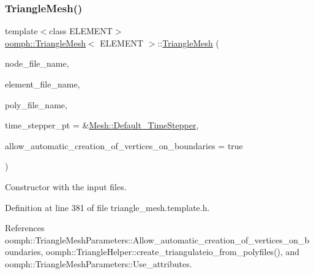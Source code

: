 \subsubsection{\texorpdfstring{Triangle\+Mesh()}{TriangleMesh()}\hspace{0.1cm}{\footnotesize\ttfamily [2/5]}}
{\footnotesize\ttfamily template$<$class E\+L\+E\+M\+E\+NT$>$ \\
\hyperlink{classoomph_1_1TriangleMesh}{oomph\+::\+Triangle\+Mesh}$<$ E\+L\+E\+M\+E\+NT $>$\+::\hyperlink{classoomph_1_1TriangleMesh}{Triangle\+Mesh} (\begin{DoxyParamCaption}\item[{const std\+::string \&}]{node\+\_\+file\+\_\+name,  }\item[{const std\+::string \&}]{element\+\_\+file\+\_\+name,  }\item[{const std\+::string \&}]{poly\+\_\+file\+\_\+name,  }\item[{\hyperlink{classoomph_1_1TimeStepper}{Time\+Stepper} $\ast$}]{time\+\_\+stepper\+\_\+pt = {\ttfamily \&\hyperlink{classoomph_1_1Mesh_a12243d0fee2b1fcee729ee5a4777ea10}{Mesh\+::\+Default\+\_\+\+Time\+Stepper}},  }\item[{const bool \&}]{allow\+\_\+automatic\+\_\+creation\+\_\+of\+\_\+vertices\+\_\+on\+\_\+boundaries = {\ttfamily true} }\end{DoxyParamCaption})\hspace{0.3cm}{\ttfamily [inline]}}



Constructor with the input files. 



Definition at line 381 of file triangle\+\_\+mesh.\+template.\+h.



References oomph\+::\+Triangle\+Mesh\+Parameters\+::\+Allow\+\_\+automatic\+\_\+creation\+\_\+of\+\_\+vertices\+\_\+on\+\_\+boundaries, oomph\+::\+Triangle\+Helper\+::create\+\_\+triangulateio\+\_\+from\+\_\+polyfiles(), and oomph\+::\+Triangle\+Mesh\+Parameters\+::\+Use\+\_\+attributes.

\mbox{\label{classoomph_1_1TriangleMesh_a9178e41a6f4af03bbb6b304ac3c201aa}} 
